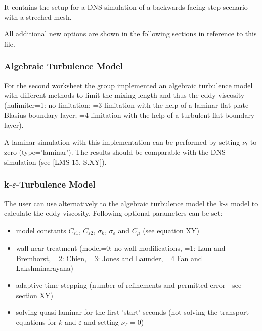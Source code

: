 \noii It contains the setup for a DNS simulation of a backwards facing step scenario with a streched mesh.


\noii All additional new options are shown in the following sections in reference to this file.

\newpage
\subsubsection*{Algebraic Turbulence Model}

For the second worksheet the group implemented an algebraic turbulence model with different methods to limit the mixing length and thus the eddy viscosity (nulimiter=1: no limitation; =3 limitation with the help of a laminar flat plate Blasius boundary layer; =4 limitation with the help of a turbulent flat boundary layer). 


\noii A laminar simulation with this implementation can be performed by setting $\nu_t$ to zero (type='laminar'). The results should be comparable with the DNS-simulation (see [LMS-15, S.XY]).  

\subsubsection*{k-$\varepsilon$-Turbulence Model}

The user can use alternatively to the algebraic turbulence model the k-$\varepsilon$ model to calculate the eddy viscosity. Following optional parameters can be set:
\begin{itemize}
\item model constants $C_{\varepsilon 1}$, $C_{\varepsilon 2}$, $\sigma_k$, $\sigma_\varepsilon$ and $C_{\mu}$ (see equation XY)
\item wall near treatment (model=0: no wall modifications, =1: Lam and Bremhorst, =2: Chien, =3: Jones and Launder, =4 Fan and Lakshminarayana)
\item adaptive time stepping (number of refinements and permitted error - see section XY)
\item solving quasi laminar for the first 'start' seconds (not solving the transport equations for $k$ and $\varepsilon$ and setting $\nu_T=0$)
\end{itemize}


